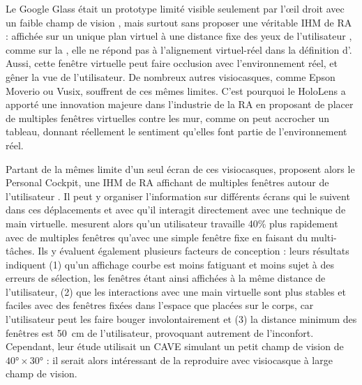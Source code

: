 Le Google Glass était un prototype limité visible seulement par l'\oe il droit avec un faible champ de vision , mais surtout sans proposer une véritable IHM de RA : affichée sur un unique plan virtuel à une distance fixe des yeux de l'utilisateur , comme sur la , elle ne répond pas à l'alignement virtuel-réel dans la définition d'\cite{Azuma1997}. Aussi, cette fenêtre virtuelle peut faire occlusion avec l'environnement réel, et gêner la vue de l'utilisateur. De nombreux autres visiocasques, comme Epson Moverio ou Vusix, souffrent de ces mêmes limites. C'est pourquoi le HoloLens a apporté une innovation majeure dans l'industrie de la RA en proposant de placer de multiples fenêtres virtuelles contre les mur, comme on peut accrocher un tableau, donnant réellement le sentiment qu'elles font partie de l'environnement réel.


Partant de la mêmes limite d'un seul écran de ces visiocasques, \cite{Ens2014} proposent alors le Personal Cockpit, une IHM de RA affichant de multiples fenêtres autour de l'utilisateur . Il peut y organiser l'information sur différents écrans qui le suivent dans ces déplacements et avec qu'il interagit directement avec une technique de main virtuelle. \citeauthor{Ens2014} mesurent alors qu'un utilisateur travaille 40\% plus rapidement avec de multiples fenêtres qu'avec une simple fenêtre fixe en faisant du multi-tâches. Ils y évaluent également plusieurs facteurs de conception : leurs résultats indiquent (1) qu'un affichage courbe est moins fatiguant et moins sujet à des erreurs de sélection, les fenêtres étant ainsi affichées à la même distance de l'utilisateur, (2) que les interactions avec une main virtuelle sont plus stables et faciles avec des fenêtres fixées dans l'espace que placées sur le corps, car l'utilisateur peut les faire bouger involontairement et (3) la distance minimum des fenêtres est \SI{50}{\cm} de l'utilisateur, provoquant autrement de l'inconfort. Cependant, leur étude utilisait un CAVE simulant un petit champ de vision de $\ang{40} \times \ang{30}$ : il serait alors intéressant de la reproduire avec visiocasque à large champ de vision.

